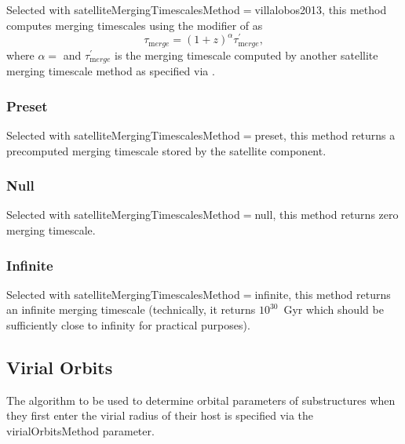 Selected with {\normalfont \ttfamily satelliteMergingTimescalesMethod}$=${\normalfont \ttfamily villalobos2013}, this method computes merging timescales using the modifier of \cite{villalobos_improved_2013} as
\begin{equation}
\tau_{\mathrm merge} = (1+z)^\alpha \tau^\prime_{\mathrm merge},
\end{equation}
where $\alpha=${\normalfont {}} and $\tau^\prime_{\mathrm merge}$ is the merging timescale computed by another satellite merging timescale method as specified via {\normalfont {}}.

\subsubsection{Preset}\label{phys:satelliteMergingTimescales:satelliteMergingTimescalesPreset}

Selected with {\normalfont \ttfamily satelliteMergingTimescalesMethod}$=${\normalfont \ttfamily preset}, this method returns a precomputed merging timescale stored by the satellite component.

\subsubsection{Null}\label{phys:satelliteMergingTimescales:satelliteMergingTimescalesNull}

Selected with {\normalfont \ttfamily satelliteMergingTimescalesMethod}$=${\normalfont \ttfamily null}, this method returns zero merging timescale.

\subsubsection{Infinite}\label{phys:satelliteMergingTimescales:satelliteMergingTimescalesInfinite}

Selected with {\normalfont \ttfamily satelliteMergingTimescalesMethod}$=${\normalfont \ttfamily infinite}, this method returns an infinite merging timescale (technically, it returns $10^{30}$~Gyr which should be sufficiently close to infinity for practical purposes).

\subsection{Virial Orbits}

The algorithm to be used to determine orbital parameters of substructures when they first enter the virial radius of their host is specified via the {\normalfont \ttfamily virialOrbitsMethod} parameter.

